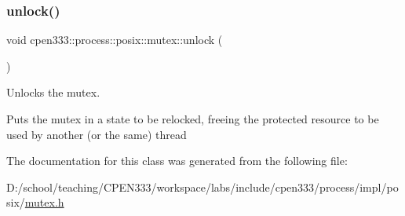 \subsubsection{\texorpdfstring{unlock()}{unlock()}}
{\footnotesize\ttfamily void cpen333\+::process\+::posix\+::mutex\+::unlock (\begin{DoxyParamCaption}{ }\end{DoxyParamCaption})\hspace{0.3cm}{\ttfamily [inline]}}



Unlocks the mutex. 

Puts the mutex in a state to be relocked, freeing the protected resource to be used by another (or the same) thread 

The documentation for this class was generated from the following file\+:\begin{DoxyCompactItemize}
\item 
D\+:/school/teaching/\+C\+P\+E\+N333/workspace/labs/include/cpen333/process/impl/posix/\hyperlink{impl_2posix_2mutex_8h}{mutex.\+h}\end{DoxyCompactItemize}
